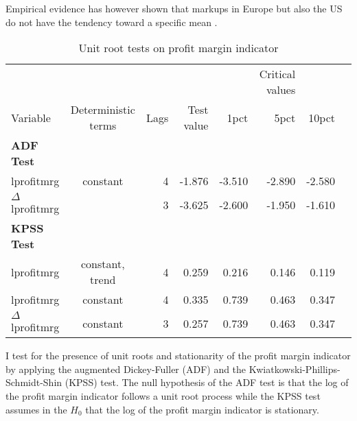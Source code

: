 \documentclass[twoside]{article}
\begin{document}
\begin{multicols}{2}
 Empirical evidence has however shown that markups in Europe but also the US do not have the tendency toward a specific mean \citep{Gali2001European,Kim2010Identifying}. 
\begin{table}[H]
\centering
\begin{tabular}{lcrrrrrr}
  \hline
                    &                     &      &            &        & Critical values & \\
Variable            & Deterministic terms & Lags & Test value & 1pct   & 5pct            & 10pct \\
  \hline
\textbf{ADF Test}             &                     &      &            &        &                 & \\
lprofitmrg          & constant            & 4    & -1.876     & -3.510 & -2.890          & -2.580 \\
$\Delta$ lprofitmrg &                     & 3    & -3.625     & -2.600 & -1.950          & -1.610 \\


\textbf{KPSS Test}           &                     &      &            &        &                 & \\
lprofitmrg          & constant, trend     & 4    & 0.259      & 0.216  & 0.146           & 0.119 \\
lprofitmrg          & constant            & 4    & 0.335      & 0.739  & 0.463           & 0.347 \\
$\Delta$ lprofitmrg & constant            & 3    & 0.257      & 0.739  & 0.463           & 0.347 \\
   \hline
\end{tabular}
\caption{Unit root tests on profit margin indicator} 
\vspace*{-3mm} %
\label{table: unit root test}
\end{table}

I test for the presence of unit roots and stationarity of the profit margin indicator by applying the augmented Dickey-Fuller (ADF) and the Kwiatkowski-Phillips-Schmidt-Shin (KPSS) test. The null hypothesis of the ADF test is that the log of the profit margin indicator follows a unit root process while the KPSS test assumes in the $H_{0}$ that the log of the profit margin indicator is stationary. 


\end{multicols}
\end{document}

